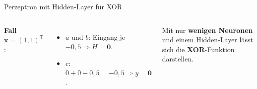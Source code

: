 \begin{frame}{Perzeptron mit Hidden-Layer für XOR}
\begin{columns}
\vspace{0.3em}
\textbf{Fall} $\mathbf{x} = (1,1)^{\mathsf{T}}$:
\begin{itemize}
  \item $a$ und $b$: Eingang je $-0{,}5 \Rightarrow H = \mathbf{0}$.
  \item $c$: $0 + 0 - 0{,}5 = -0{,}5 \Rightarrow y = \mathbf{0}$.
\end{itemize}

\vspace{0.3em}
Mit nur \textbf{wenigen Neuronen} und einem Hidden-Layer lässt sich die
\textbf{XOR}-Funktion darstellen.
\end{columns}
\end{frame}

